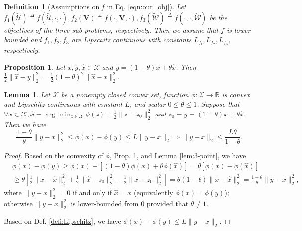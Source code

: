 \documentclass{article}
\newtheorem{prop}{Proposition}
\newtheorem{lemma}{Lemma}
\newtheorem{defi}{Definition}
\begin{document}
\begin{defi}[Assumptions on $f$ in Eq. \ref{eqn:our_obj}]\label{defi:assumption}
Let $f_1(\tilde{\mathcal{U}})\stackrel{\Delta}{=}f(\tilde{\mathcal{U}}, \cdot, \cdot), f_2(\mathbf{V})\stackrel{\Delta}{=}f(\cdot, \mathbf{V}, \cdot), f_3(\tilde{\mathcal{W}})\stackrel{\Delta}{=}f(\cdot, \cdot, \tilde{\mathcal{W}})$ be the objectives of the three sub-problems, respectively. Then we assume that $f$ is lower-bounded and $f_1, f_2, f_3$ are Lipschitz continuous with constants $L_{f_1}, L_{f_2}, L_{f_3}$, respectively.
\end{defi}

\begin{prop}\label{prop:1}
Let $x,y,\hat{x}\in\mathcal{X}$ and $y=(1-\theta)x+\theta\hat{x}$. Then $\frac{1}{2}\|\hat{x}-y\|_2^2 = \frac{1}{2}\left(1-\theta\right)^2\|\hat{x}-x\|_2^2.$
\end{prop}

\begin{lemma}\label{lem:phi}
Let $\mathcal{X}$ be a nonempty closed convex set, function $\phi:\mathcal{X}\rightarrow \mathbb{R}$ is convex and Lipschitz continuous with constant $L$, and scalar $0\leq\theta\leq 1$. Suppose that $\forall x\in\mathcal{X}, \hat{x}=\arg\min_{z\in\mathcal{X}}\phi(z)+\frac{1}{2}\|z-z_0\|_2^2$ and $z_0=y=(1-\theta)x+\theta\hat{x}$. Then we have
$$\frac{1-\theta}{\theta}\|y-x\|_2^2 \leq \phi(x)-\phi(y) \leq L\|y-x\|_2 \Rightarrow \|y-x\|_2\leq \frac{L\theta}{1-\theta}.$$
\end{lemma}
\begin{proof}
Based on the convexity of $\phi$, Prop. \ref{prop:1}, and Lemma \ref{lem:3-point}, we have
\begin{align}
& \phi(x)-\phi(y) \geq\phi(x)-\left[\left(1-\theta\right)\phi(x)+\theta\phi(\hat{x})\right]=\theta\left[\phi(x) - \phi(\hat{x})\right] \nonumber \\
&\geq \theta\left[\frac{1}{2}\|x-\hat{x}\|_2^2 + \frac{1}{2}\|\hat{x} - z_0\|_2^2 - \frac{1}{2}\|x-z_0\|_2^2\right] = \theta\left(1-\theta\right)\|x-\hat{x}\|_2^2 = \frac{1-\theta}{\theta}\|y-x\|_2^2, \nonumber 
\end{align}
where $\|y-x\|_2^2=0$ if and only if $\hat{x}=x$ (equivalently $\phi(x)=\phi(y)$); otherwise $\|y-x\|_2^2$ is lower-bounded from 0 provided that $\theta\neq 1$.

Based on Def. \ref{defi:Lipschitz}, we have $\phi(x)-\phi(y) \leq L\|y-x\|_2$.
\end{proof}
\end{document}
